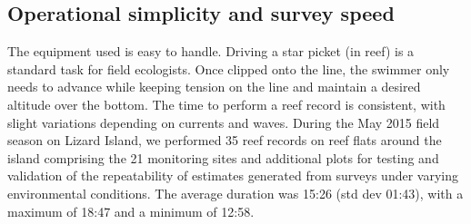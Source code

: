 \subsection{Operational simplicity and survey speed}
The equipment used is easy to handle. Driving a star picket (in reef) is a standard task for field ecologists. Once clipped onto the line, the swimmer only needs to advance while keeping tension on the line and maintain a desired altitude over the bottom.  
The time to perform a reef record is consistent, with slight variations depending on currents and waves. During the May 2015 field season on Lizard Island, we performed 35 reef records on reef flats around the island comprising the 21 monitoring sites and additional plots for testing and validation of the repeatability of estimates generated from surveys under varying environmental conditions. The average duration was 15:26 (std dev 01:43), with a maximum of 18:47 and a minimum of 12:58. 

